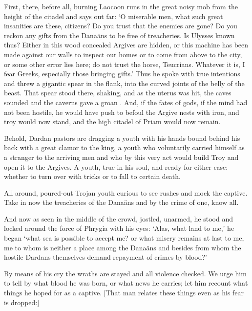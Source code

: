 First, there, before all, burning Laocoon runs in the great noisy mob from the
height of the citadel and says out far: `O miserable men, what such great insanities
are these, citizens?   Do you trust that the enemies are gone?  Do you reckon any gifts from the
Dana\"ans to be free of treacheries.  Is Ulysses known thus?  Either in this wood concealed
Argives are hidden, or this machine has been made against our walls to inspect our homes
or to come from above to the city, or some
other error lies here; do not trust the horse, Teucrians.
Whatever it is, I fear Greeks, especially those bringing gifts.'
Thus he spoke with true intentions and threw
a gigantic spear in the flank, into the curved joints of the belly of the beast.  That spear 
stood there, shaking, and as the uterus was hit, the caves sounded and the caverns gave a groan .
And, if the fates of gods, if the mind had not been hostile, he would have push to
befoul the Argive nests with iron, and troy would now stand, and
the high citadel of Priam would now remain.

Behold, Dardan pastors are dragging a youth with his hands bound behind his 
back with a great clamor to the king, a youth who voluntarily carried
himself as a stranger to the arriving men and who by this very act would build Troy and open it to the 
Argives.  A youth, true in his soul, and ready for either case: whether to turn over with tricks or to
fall to certain death.

All around, poured-out Trojan youth curious to see rushes and
mock the captive.  Take in now the treacheries
of the Dana\"ans and by the crime of one, know all.

And now as seen in the middle of the crowd, jostled, unarmed,
he stood and locked around the force of Phrygia with his eyes:
`Alas, what land to me,' he began `what sea is possible to accept me?
or what misery remains at last to me, me to whom is neither
a place among the Dana\"ans and besides from whom the hostile
Dardans themselves demand repayment of crimes by blood?'

By means of his cry the wraths are stayed
and all violence checked.  We urge him to tell by what blood he
was born, or what news he carries; let him recount what things he 
hoped for as a captive.
[That man relates these things even as his fear is dropped:]
